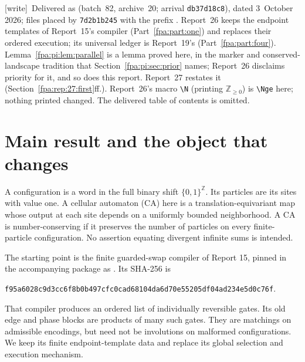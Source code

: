 \documentclass[11pt,a4paper]{article}
\numberwithin{equation}{section}
\newcommand{\N}{\mathbb N}\newcommand{\Z}{\mathbb Z}\newcommand{\R}{\mathbb R}
\newcommand{\Nge}{\mathbb Z_{\ge0}}\newcommand{\Nzero}{\mathbb N_0}
\newcommand{\X}{\{0,1\}^{\mathbb Z}}\newcommand{\id}{\operatorname{id}}
\newcommand{\file}[1]{\texttt{\detokenize{#1}}}
\newcommand{\wtag}{\textup{[write]}}
\begin{document}
\wtag\ Delivered as  (batch~82, archive~20; arrival \texttt{db37d18c8}), dated 3~October 2026; files placed by \texttt{7d2b1b245} with the prefix . Report~26 keeps the endpoint templates of Report~15's compiler (Part~\ref{fpa:part:one}) and replaces their ordered execution; its universal ledger is Report~19's (Part~\ref{fpa:part:four}). Lemma~\ref{fpa:pi:lem:parallel} is a lemma proved here, in the marker and conserved-landscape tradition that Section~\ref{fpa:pi:sec:prior} names; Report~26 disclaims priority for it, and so does this report. Report~27 restates it (Section~\ref{fpa:rep:27:first}ff.). Report~26's macro \verb|\N| (printing $\mathbb Z_{\ge0}$) is \verb|\Nge| here; nothing printed changed. The delivered table of contents is omitted.

\section{Main result and the object that changes}\label{fpa:rep:26:first}\label{fpa:pi:sec:main}
A configuration is a word in the full binary shift $\X$. Its particles are its sites with value one. A cellular automaton (CA) here is a translation-equivariant map whose output at each site depends on a uniformly bounded neighborhood. A CA is number-conserving if it preserves the number of particles on every finite-particle configuration. No assertion equating divergent infinite sums is intended.

The starting point is the finite guarded-swap compiler of Report 15, pinned in the accompanying package as \file{scientific/frozen_reversible_binary.py}. Its SHA-256 is
\begin{center}\small\texttt{f95a6028c9d3cc6f8b0b497cfc0cad68104da6d70e55205df04ad234e5d0c76f}.\end{center}
That compiler produces an ordered list of individually reversible gates. Its old edge and phase blocks are products of many such gates. They are matchings on admissible encodings, but need not be involutions on malformed configurations. We keep its finite endpoint-template data and replace its global selection and execution mechanism.
\end{document}
